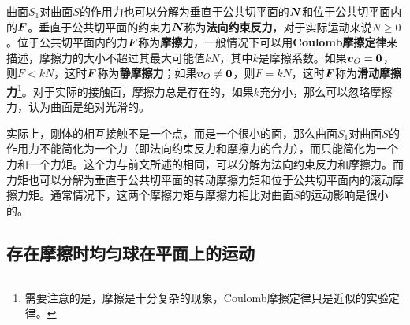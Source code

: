 曲面$S_1$对曲面$S$的作用力也可以分解为垂直于公共切平面的$\boldsymbol{N}$和位于公共切平面内的$\boldsymbol{F}$。垂直于公共切平面的约束力$\boldsymbol{N}$称为{\bf 法向约束反力}，对于实际运动来说$N\geqslant 0$。位于公共切平面内的力$\boldsymbol{F}$称为{\bf 摩擦力}，一般情况下可以用{\bf Coulomb摩擦定律}来描述，摩擦力的大小不超过其最大可能值$kN$，其中$k$是摩擦系数。如果$\boldsymbol{v}_O=\boldsymbol{0}$，则$F<kN$，这时$\boldsymbol{F}$称为{\bf 静摩擦力}；如果$\boldsymbol{v}_O\neq\boldsymbol{0}$，则$F=kN$，这时$\boldsymbol{F}$称为{\bf 滑动摩擦力}\footnote{需要注意的是，摩擦是十分复杂的现象，Coulomb摩擦定律只是近似的实验定律。}。对于实际的接触面，摩擦力总是存在的，如果$k$充分小，那么可以忽略摩擦力，认为曲面是绝对光滑的。

实际上，刚体的相互接触不是一个点，而是一个很小的面，那么曲面$S_1$对曲面$S$的作用力不能简化为一个力（即法向约束反力和摩擦力的合力），而只能简化为一个力和一个力矩。这个力与前文所述的相同，可以分解为法向约束反力和摩擦力。而力矩也可以分解为垂直于公共切平面的转动摩擦力矩和位于公共切平面内的滚动摩擦力矩。通常情况下，这两个摩擦力矩与摩擦力相比对曲面$S$的运动影响是很小的。

\subsection{存在摩擦时均匀球在平面上的运动}

